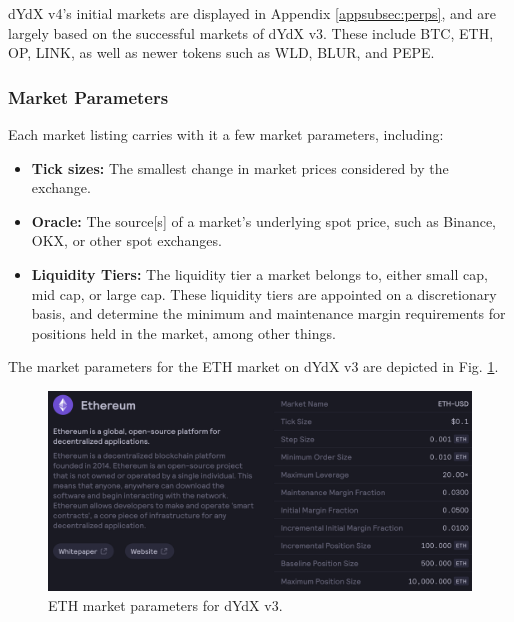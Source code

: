             dYdX v4's initial markets are displayed in Appendix \ref{appsubsec:perps}, and are largely based on the successful markets of dYdX v3. These include BTC, ETH, OP, LINK, as well as newer tokens such as WLD, BLUR, and PEPE. 

        \subsubsection{Market Parameters}
    
            Each market listing carries with it a few market parameters, including:

            \begin{itemize}
                \item \textbf{Tick sizes:} The smallest change in market prices considered by the exchange.
                \item \textbf{Oracle:} The source[s] of a market's underlying spot price, such as Binance, OKX, or other spot exchanges.
                \item \textbf{Liquidity Tiers:} The liquidity tier a market belongs to, either small cap, mid cap, or large cap. These liquidity tiers are appointed on a discretionary basis, and determine the minimum and maintenance margin requirements for positions held in the market, among other things.
            \end{itemize}

            The market parameters for the ETH market on dYdX v3 are depicted in Fig. \ref{fig:eth_mkt_params}.

            \begin{figure}[htp]
                \centering
                \includegraphics[width=\linewidth]{figs/ETH_mkt_params.png}
                \captionsetup{width=\linewidth}
                \caption{ETH market parameters for dYdX v3.}
                \label{fig:eth_mkt_params}
            \end{figure}

